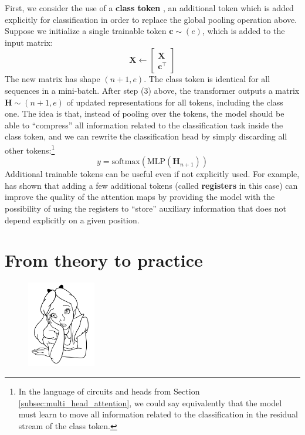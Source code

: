 First, we consider the use of a \textbf{class token} \cite{dosovitskiy2020image}, an additional token which is added explicitly for classification in order to replace the global pooling operation above. Suppose we initialize a single trainable token $\mathbf{c} \sim (e)$, which is added to the input matrix:
%
$$
\mathbf{X} \leftarrow\begin{bmatrix}\mathbf{X} \\ \mathbf{c}^\top \end{bmatrix}
$$
%
The new matrix has shape $(n+1, e)$. The class token is identical for all sequences in a mini-batch. After step (3) above, the transformer outputs a matrix $\mathbf{H} \sim (n+1,e)$ of updated representations for all tokens, including the class one. The idea is that, instead of pooling over the tokens, the model should be able to “compress” all information related to the classification task inside the class token, and we can rewrite the classification head by simply discarding all other tokens:\footnote{In the language of circuits and heads from Section \ref{subsec:multi_head_attention}, we could say equivalently that the model must learn to move all information related to the classification in the residual stream of the class token.}
%
$$
y=\text{softmax}\left(\text{MLP}\left(\mathbf{H}_{n+1}\right)\right)
$$
%
Additional trainable tokens can be useful even if not explicitly used. For example, \cite{darcet2023vision} has shown that adding a few additional tokens (called \textbf{registers} in this case) can improve the quality of the attention maps by providing the model with the possibility of using the registers to “store” auxiliary information that does not depend explicitly on a given position.

\section*{From theory to practice}

\begin{figure}
\vspace{-6em}\includegraphics[width=3.0cm]{images/shutterstock_2075221579.jpg}
\vspace{-4em}
\end{figure}

